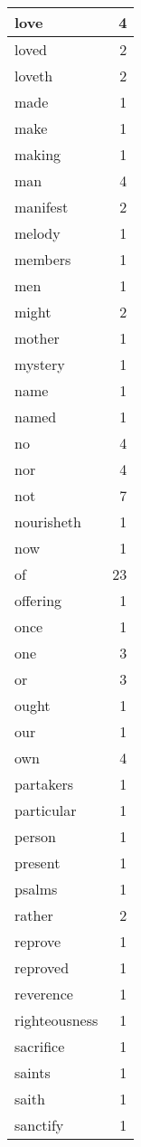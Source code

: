 \begin{center}
\begin{longtable}{l|r}
love & 4\\ \hline 
loved & 2\\ \hline 
loveth & 2\\ \hline 
made & 1\\ \hline 
make & 1\\ \hline 
making & 1\\ \hline 
man & 4\\ \hline 
manifest & 2\\ \hline 
melody & 1\\ \hline 
members & 1\\ \hline 
men & 1\\ \hline 
might & 2\\ \hline 
mother & 1\\ \hline 
mystery & 1\\ \hline 
name & 1\\ \hline 
named & 1\\ \hline 
no & 4\\ \hline 
nor & 4\\ \hline 
not & 7\\ \hline 
nourisheth & 1\\ \hline 
now & 1\\ \hline 
of & 23\\ \hline 
offering & 1\\ \hline 
once & 1\\ \hline 
one & 3\\ \hline 
or & 3\\ \hline 
ought & 1\\ \hline 
our & 1\\ \hline 
own & 4\\ \hline 
partakers & 1\\ \hline 
particular & 1\\ \hline 
person & 1\\ \hline 
present & 1\\ \hline 
psalms & 1\\ \hline 
rather & 2\\ \hline 
reprove & 1\\ \hline 
reproved & 1\\ \hline 
reverence & 1\\ \hline 
righteousness & 1\\ \hline 
sacrifice & 1\\ \hline 
saints & 1\\ \hline 
saith & 1\\ \hline 
sanctify & 1\\ \hline 

\end{longtable}
\end{center}
